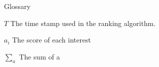 
\begin{dictionary}{Glossary}
\item[$T$] The time stamp used in the ranking algorithm.
\item[$a_i$] The score of each interest
\item[$\sum_a$] The sum of a
\end{dictionary}
